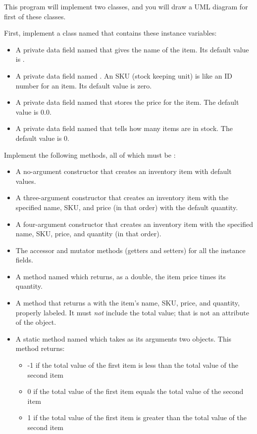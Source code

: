 \begin{exercise}
This program will implement two classes, and you will draw a UML diagram for first of these classes.

First, implement a class named  that contains these instance variables:

\begin{itemize}
    \item A private  data field named  that gives the name of the item. Its default value is .
    \item A private  data field named . An SKU (stock keeping unit) is like an ID number for an item. Its default value is zero.
    \item A private  data field named  that stores the price for the item. The default value is 0.0.
    \item A private  data field named  that tells how many items are in stock. The default value is 0.
\end{itemize}

Implement the following methods, all of which must be :

\begin{itemize}
    \item A no-argument constructor that creates an inventory item with default values.
    \item A three-argument constructor that creates an inventory item with the specified name, SKU, and price (in that order) with the default quantity.
    \item A four-argument constructor that creates an inventory item with the specified name, SKU, price, and quantity (in that order).
    \item The accessor and mutator methods (getters and setters) for all the instance fields.
    \item A method named  which returns, as a double, the item price times its quantity.
    \item A  method that returns a  with the item's name, SKU, price, and quantity, properly labeled. It must {\em not} include the total value; that is not an attribute of the object.
    \item A static method named  which takes as its arguments two  objects. This method returns:
        \begin{itemize}
            \item -1 if the total value of the first item is less than the total value of the second item
            \item 0 if the total value of the first item equals the total value of the second item
            \item 1 if the total value of the first item is greater than the total value of the second item
        \end{itemize}
        

\end{itemize}
\end{exercise}
